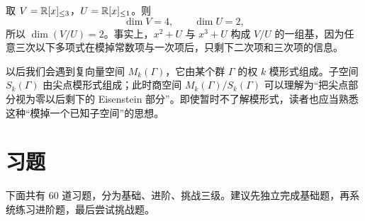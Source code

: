 \begin{example}[多项式空间的商]
取 $V=\mathbb{R}[x]_{\le 3}$，$U=\mathbb{R}[x]_{\le 1}$。则
\[
\dim V=4,\qquad \dim U=2,
\]
所以 $\dim(V/U)=2$。事实上，$x^2+U$ 与 $x^3+U$ 构成 $V/U$ 的一组基，因为任意三次以下多项式在模掉常数项与一次项后，只剩下二次项和三次项的信息。
\end{example}

\begin{remark}[与模形式空间的联系]
以后我们会遇到复向量空间 $M_k(\Gamma)$，它由某个群 $\Gamma$ 的权 $k$ 模形式组成。子空间 $S_k(\Gamma)$ 由尖点模形式组成；此时商空间 $M_k(\Gamma)/S_k(\Gamma)$ 可以理解为“把尖点部分视为零以后剩下的 Eisenstein 部分”。即使暂时不了解模形式，读者也应当熟悉这种“模掉一个已知子空间”的思想。
\end{remark}

\section*{习题}

下面共有 $60$ 道习题，分为基础、进阶、挑战三级。建议先独立完成基础题，再系统练习进阶题，最后尝试挑战题。

